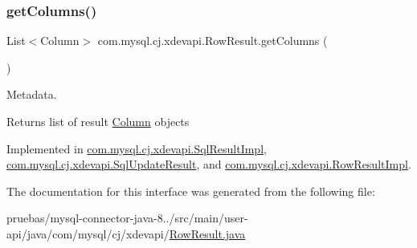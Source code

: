 \mbox{\label{interfacecom_1_1mysql_1_1cj_1_1xdevapi_1_1_row_result_a4bd495dadd5549516c0f32366f8d77c7}} 
\subsubsection{\texorpdfstring{get\+Columns()}{getColumns()}}
{\footnotesize\ttfamily List$<$Column$>$ com.\+mysql.\+cj.\+xdevapi.\+Row\+Result.\+get\+Columns (\begin{DoxyParamCaption}{ }\end{DoxyParamCaption})}

Metadata.

\begin{DoxyReturn}{Returns}
list of result \mbox{\hyperlink{interfacecom_1_1mysql_1_1cj_1_1xdevapi_1_1_column}{Column}} objects 
\end{DoxyReturn}


Implemented in \mbox{\hyperlink{classcom_1_1mysql_1_1cj_1_1xdevapi_1_1_sql_result_impl_a284f0953dcca6644eb9eff7749e32f9b}{com.\+mysql.\+cj.\+xdevapi.\+Sql\+Result\+Impl}}, \mbox{\hyperlink{classcom_1_1mysql_1_1cj_1_1xdevapi_1_1_sql_update_result_a229524cce1f3a1157e52d8f3d7b9dfc1}{com.\+mysql.\+cj.\+xdevapi.\+Sql\+Update\+Result}}, and \mbox{\hyperlink{classcom_1_1mysql_1_1cj_1_1xdevapi_1_1_row_result_impl_a080528edc647e5ab131333d69042b167}{com.\+mysql.\+cj.\+xdevapi.\+Row\+Result\+Impl}}.



The documentation for this interface was generated from the following file\+:\begin{DoxyCompactItemize}
\item 
pruebas/mysql-\/connector-\/java-\/8../src/main/user-\/api/java/com/mysql/cj/xdevapi/\mbox{\hyperlink{_row_result_8java}{Row\+Result.\+java}}\end{DoxyCompactItemize}
